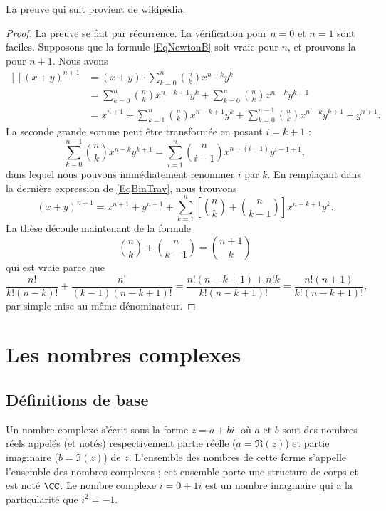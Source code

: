 La preuve qui suit provient de \href{http://fr.wikipedia.org/wiki/Formule_du_binôme_de_Newton}{wikipédia}.
\begin{proof}
La preuve se fait par récurrence. La vérification pour $n=0$ et $n=1$ sont faciles. Supposons que la formule \eqref{EqNewtonB} soit vraie pour $n$, et prouvons la pour $n+1$. Nous avons
\begin{equation}		\label{EqBinTrav}
	\begin{aligned}[]
		(x+y)^{n+1}	&=(x+y)\cdot  \sum_{k=0}^n{n\choose k}x^{n-k}y^k\\
				&= \sum_{k=0}^n{n\choose k}x^{n-k+1}y^k+\sum_{k=0}^n{n\choose k}x^{n-k}y^{k+1}\\
				&=x^{n+1}+ \sum_{k=1}^n{n\choose k}x^{n-k+1}y^k+\sum_{k=0}^{n-1}{n\choose k}x^{n-k}y^{k+1}+y^{n+1}.
	\end{aligned}
\end{equation}
La seconde grande somme peut être transformée en posant $i=k+1$ :
\begin{equation}
	\sum_{k=0}^{n-1}{n\choose k}x^{n-k}y^{k+1}	=\sum_{i=1}^n{n\choose i-1}x^{n-(i-1)}y^{i-1+1},
\end{equation}
dans lequel nous pouvons immédiatement renommer $i$ par $k$. En remplaçant dans la dernière expression de \eqref{EqBinTrav}, nous trouvons
\begin{equation}
	(x+y)^{n+1}=x^{n+1}+y^{n+1}+\sum_{k=1}^n\left[ {n\choose k}+{n\choose k-1} \right]x^{n-k+1}y^k.
\end{equation}
La thèse découle maintenant de la formule
\begin{equation}
	{n\choose k}+{n\choose k-1}={n+1\choose k}
\end{equation}
qui est vraie parce que
\begin{equation}
	\frac{ n! }{ k!(n-k)! }+\frac{ n! }{ (k-1)(n-k+1)! }=\frac{ n!(n-k+1)+n!k }{ k!(n-k+1)! }=\frac{ n!(n+1) }{  k!(n-k+1)!  },
\end{equation}
par simple mise au même dénominateur.
\end{proof}


 \section{Les nombres complexes}
 \subsection{Définitions de base}
 Un nombre complexe s'écrit sous la forme $z = a + b i$, où $a$ et $b$
 sont des nombres réels appelés (et notés) respectivement partie réelle
 ($a = \Re(z)$) et partie imaginaire ($b = \Im(z)$) de $z$. L'ensemble
 des nombres de cette forme s'appelle l'ensemble des nombres complexes
 ; cet ensemble porte une structure de corps et est noté $\CC$. Le
 nombre complexe $i = 0 + 1 i$ est un nombre imaginaire qui a la
 particularité que $i^2 = -1$.

